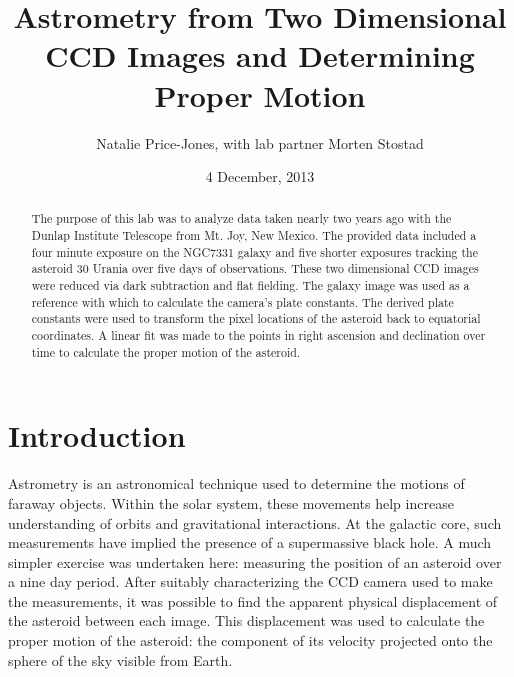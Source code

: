 \documentclass[a4paper,12pt]{article}
\begin{document}
\onehalfspacing
\title{Astrometry from Two Dimensional CCD Images and Determining Proper Motion}
\author{Natalie Price-Jones, with lab partner Morten Stostad}
\date{4 December, 2013}
\maketitle


\begin{abstract}
\label{abstract}

The purpose of this lab was to analyze data taken nearly two years ago with the Dunlap Institute Telescope from Mt. Joy, New Mexico. The provided data included a four minute exposure on the NGC7331 galaxy and five shorter exposures tracking the asteroid 30 Urania over five days of observations. These two dimensional CCD images were reduced via dark subtraction and flat fielding. The galaxy image was used as a reference with which to calculate the camera's plate constants. The derived plate constants were used to transform the pixel locations of the asteroid back to equatorial coordinates. A linear fit was made to the points in right ascension and declination over time to calculate the proper motion of the asteroid.

\end{abstract}


\section{Introduction}
\label{sec:intro}

Astrometry is an astronomical technique used to determine the motions of faraway objects. Within the solar system, these movements help increase understanding of orbits and gravitational interactions. At the galactic core, such measurements have implied the presence of a supermassive black hole. A much simpler exercise was undertaken here: measuring the position of an asteroid over a nine day period. After suitably characterizing the CCD camera used to make the measurements, it was possible to find the apparent physical displacement of the asteroid between each image. This displacement was used to calculate the proper motion of the asteroid: the component of its velocity projected onto the sphere of the sky visible from Earth.
\end{document}
